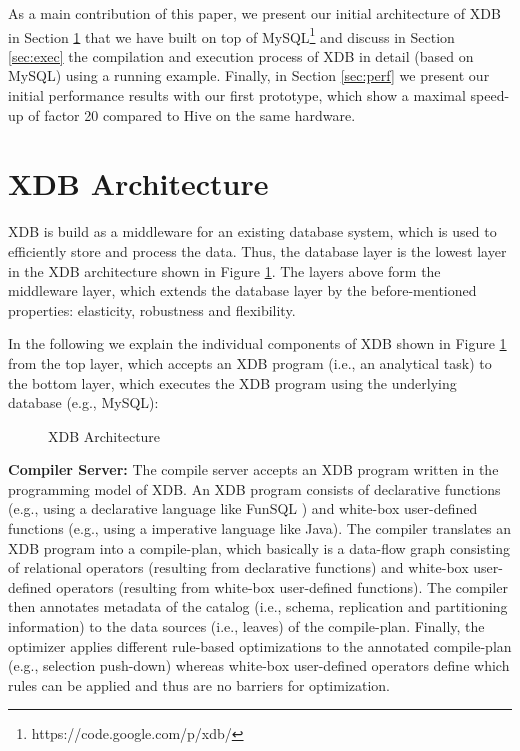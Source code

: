 \documentclass{sig-alternate}
\begin{document}
As a main contribution of this paper, we present our initial architecture of XDB in Section \ref{sec:xdb} that we have built on top of MySQL\footnote{https://code.google.com/p/xdb/} and discuss in Section \ref{sec:exec} the compilation and execution process of XDB in detail (based on MySQL) using a running example. Finally, in Section \ref{sec:perf} we present our initial performance results with our first prototype, which show a maximal speed-up of factor 20 compared to Hive on the same hardware.

\section{XDB Architecture}
\label{sec:xdb}

XDB is build as a middleware for an existing database system, which is used to efficiently store and process the data.
Thus, the database layer is the lowest layer in the  XDB architecture shown in Figure \ref{fig:xdb:architecture}. The layers above form the middleware layer, which extends the database layer by the before-mentioned properties: elasticity, robustness and flexibility. 

In the following we explain the individual components of XDB shown in Figure \ref{fig:xdb:architecture} from the top layer, which accepts an XDB program (i.e., an analytical task) to the bottom layer, which executes the XDB program using the underlying database (e.g., MySQL):\\

\begin{figure}
\hspace{-4ex}
\vspace{-5ex}
\caption{XDB Architecture}
\label{fig:xdb:architecture}
\vspace{-3ex}

\end{figure}

{\bf Compiler Server:} The compile server accepts an XDB program written in the programming model of XDB. An XDB program consists of declarative functions (e.g., using a declarative language like FunSQL \cite{FunSQL:DANAC:2012}) and white-box user-defined functions (e.g., using a imperative language like Java). The compiler translates an XDB program into a compile-plan, which basically is a data-flow graph consisting of relational operators (resulting from declarative functions) and white-box user-defined operators (resulting from white-box user-defined functions). The compiler then annotates metadata of the catalog (i.e., schema, replication and partitioning information) to the data sources (i.e., leaves) of the compile-plan. Finally, the optimizer applies different rule-based optimizations to the annotated compile-plan (e.g., selection push-down) whereas white-box user-defined operators define which rules can be applied and thus are no barriers for optimization.\\
\end{document}
